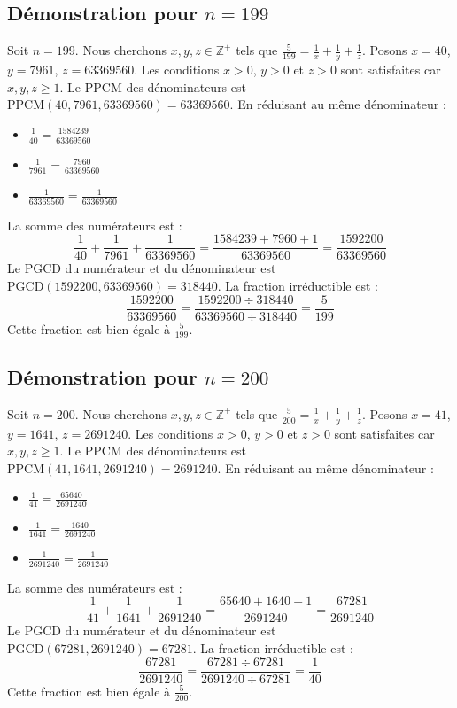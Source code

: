 \documentclass[11pt,a4paper]{article}
\begin{document}
\subsection{Démonstration pour $n = 199$}
Soit $n = 199$. Nous cherchons $x, y, z \in \mathbb{Z}^{+}$ tels que $\frac{5}{199} = \frac{1}{x} + \frac{1}{y} + \frac{1}{z}$.
Posons $x = 40$, $y = 7961$, $z = 63369560$.
Les conditions $x > 0$, $y > 0$ et $z > 0$ sont satisfaites car $x, y, z \geq 1$.
Le PPCM des dénominateurs est $\text{PPCM}(40, 7961, 63369560) = 63369560$.
En réduisant au même dénominateur :
\begin{itemize}
    \item $\frac{1}{40} = \frac{1584239}{63369560}$
    \item $\frac{1}{7961} = \frac{7960}{63369560}$
    \item $\frac{1}{63369560} = \frac{1}{63369560}$
\end{itemize}
La somme des numérateurs est :
$$ \frac{1}{40} + \frac{1}{7961} + \frac{1}{63369560} = \frac{1584239 + 7960 + 1}{63369560} = \frac{1592200}{63369560} $$
Le PGCD du numérateur et du dénominateur est $\text{PGCD}(1592200, 63369560) = 318440$.
La fraction irréductible est :
$$ \frac{1592200}{63369560} = \frac{1592200 \div 318440}{63369560 \div 318440} = \frac{5}{199} $$
Cette fraction est bien égale à $\frac{5}{199}$.

\subsection{Démonstration pour $n = 200$}
Soit $n = 200$. Nous cherchons $x, y, z \in \mathbb{Z}^{+}$ tels que $\frac{5}{200} = \frac{1}{x} + \frac{1}{y} + \frac{1}{z}$.
Posons $x = 41$, $y = 1641$, $z = 2691240$.
Les conditions $x > 0$, $y > 0$ et $z > 0$ sont satisfaites car $x, y, z \geq 1$.
Le PPCM des dénominateurs est $\text{PPCM}(41, 1641, 2691240) = 2691240$.
En réduisant au même dénominateur :
\begin{itemize}
    \item $\frac{1}{41} = \frac{65640}{2691240}$
    \item $\frac{1}{1641} = \frac{1640}{2691240}$
    \item $\frac{1}{2691240} = \frac{1}{2691240}$
\end{itemize}
La somme des numérateurs est :
$$ \frac{1}{41} + \frac{1}{1641} + \frac{1}{2691240} = \frac{65640 + 1640 + 1}{2691240} = \frac{67281}{2691240} $$
Le PGCD du numérateur et du dénominateur est $\text{PGCD}(67281, 2691240) = 67281$.
La fraction irréductible est :
$$ \frac{67281}{2691240} = \frac{67281 \div 67281}{2691240 \div 67281} = \frac{1}{40} $$
Cette fraction est bien égale à $\frac{5}{200}$.
\end{document}
